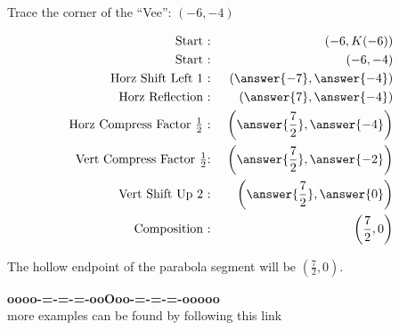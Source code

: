\documentclass{ximera}
\begin{document}
\begin{procedure} 



Trace the corner of the ``Vee'': $(-6, -4)$





\begin{align*}
\text{Start :} & \text{  } & (-6, K(-6))  \\
\text{Start :} & \text{  } & (-6, -4) \\
\text{Horz Shift Left $1$ :} & \text{  } & \left( \answer{-7}, \answer{-4} \right)   \\
\text{Horz Reflection :} & \text{  } & \left( \answer{7}, \answer{-4} \right)   \\
\text{Horz Compress Factor $\tfrac{1}{2}$ :}  & \text{  } & \left( \answer{\frac{7}{2}}, \answer{-4} \right)   \\
\text{Vert Compress Factor $\tfrac{1}{2}$:} & \text{  } & \left( \answer{\frac{7}{2}}, \answer{-2} \right)   \\
\text{Vert Shift Up $2$ :} & \text{  } & \left( \answer{\frac{7}{2}}, \answer{0} \right)   \\
\text{Composition :} & \text{  } & \left( \frac{7}{2}, 0 \right)   
\end{align*}


The hollow endpoint of the parabola segment will be $\left( \frac{7}{2}, 0 \right)$.

\end{procedure}













\begin{onlineOnly}
\begin{center}
\textbf{\textcolor{green!50!black}{oooo-=-=-=-ooOoo-=-=-=-ooooo}} \\

more examples can be found by following this link\\ 

\end{center}
\end{onlineOnly}
\end{document}
